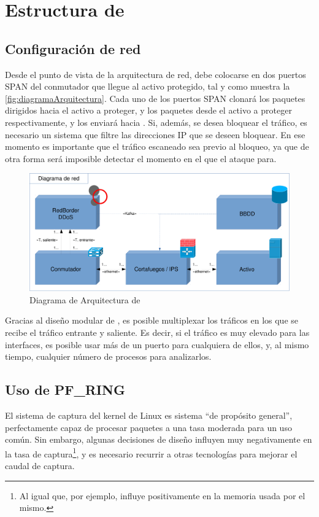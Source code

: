 \section{Estructura de \redborderddos}
\subsection{Configuración de red}\label{ssec:estructura_red}
Desde el punto de vista de la arquitectura de red, \redborderddos{} debe colocarse en dos puertos SPAN del conmutador que llegue al activo protegido, tal y como muestra la \autoref{fig:diagramaArquitectura}. Cada uno de los 
puertos SPAN clonará los paquetes dirigidos hacia el activo a proteger, y los paquetes desde el activo a proteger 
respectivamente, y los enviará hacia \redborderddos. Si, además, se desea bloquear el tráfico, es necesario
un sistema que filtre las direcciones IP que se deseen bloquear. En ese momento es importante que el tráfico escaneado sea
previo al bloqueo, ya que de otra forma será imposible detectar el momento en el que el ataque para.

\begin{figure}[htbp]
\centering
\includegraphics[width=\columnwidth]{CapituloEstructura/Figuras/DiagramaArquitectura-crop}
\caption{Diagrama de Arquitectura de \redborderddos}
\label{fig:diagramaArquitectura}
\end{figure}
%

Gracias al diseño modular de \redborderddos, es posible multiplexar los tráficos en los
que se recibe el tráfico entrante y saliente. Es decir, si el tráfico es muy elevado para
las interfaces, es posible usar más de un puerto para cualquiera de ellos, y, al mismo tiempo,
cualquier número de procesos para analizarlos.

\subsection{Uso de PF\_RING}
El sistema de captura del kernel de Linux es sistema ``de propósito general'', perfectamente capaz de
procesar paquetes a una tasa moderada para un uso común. Sin embargo,
algunas decisiones de diseño influyen muy negativamente en la tasa de captura\footnote{Al igual que,
por ejemplo, influye positivamente en la memoria usada por el mismo.}, y es necesario recurrir
a otras tecnologías para mejorar el caudal de captura.

